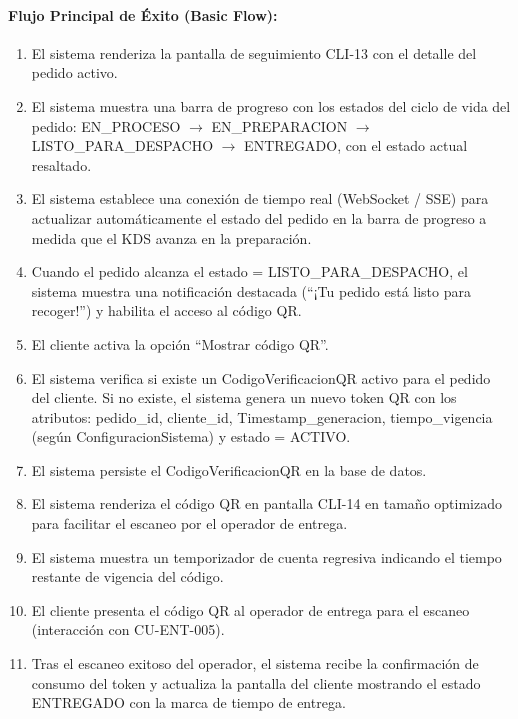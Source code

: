 \paragraph{Flujo Principal de Éxito (Basic Flow):}
\begin{enumerate}
    \item[I.] El sistema renderiza la pantalla de seguimiento CLI-13 con el detalle del pedido activo.
    \item[II.] El sistema muestra una barra de progreso con los estados del ciclo de vida del pedido: EN\_PROCESO $\rightarrow$ EN\_PREPARACION $\rightarrow$ LISTO\_PARA\_DESPACHO $\rightarrow$ ENTREGADO, con el estado actual resaltado.
    \item[III.] El sistema establece una conexión de tiempo real (WebSocket / SSE) para actualizar automáticamente el estado del pedido en la barra de progreso a medida que el KDS avanza en la preparación.
    \item[IV.] Cuando el pedido alcanza el estado = LISTO\_PARA\_DESPACHO, el sistema muestra una notificación destacada (``¡Tu pedido está listo para recoger!'') y habilita el acceso al código QR.
    \item[V.] El cliente activa la opción ``Mostrar código QR''.
    \item[VI.] El sistema verifica si existe un CodigoVerificacionQR activo para el pedido del cliente. Si no existe, el sistema genera un nuevo token QR con los atributos: pedido\_id, cliente\_id, Timestamp\_generacion, tiempo\_vigencia (según ConfiguracionSistema) y estado = ACTIVO.
    \item[VII.] El sistema persiste el CodigoVerificacionQR en la base de datos.
    \item[VIII.] El sistema renderiza el código QR en pantalla CLI-14 en tamaño optimizado para facilitar el escaneo por el operador de entrega.
    \item[IX.] El sistema muestra un temporizador de cuenta regresiva indicando el tiempo restante de vigencia del código.
    \item[X.] El cliente presenta el código QR al operador de entrega para el escaneo (interacción con CU-ENT-005).
    \item[XI.] Tras el escaneo exitoso del operador, el sistema recibe la confirmación de consumo del token y actualiza la pantalla del cliente mostrando el estado ENTREGADO con la marca de tiempo de entrega.
\end{enumerate}

